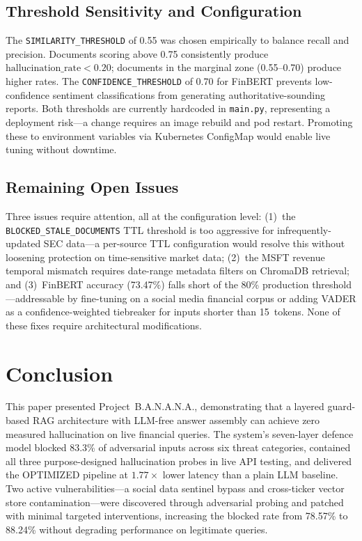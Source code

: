 \documentclass[10pt,twocolumn]{article}
\newcommand{\banana}{\mbox{B.A.N.A.N.A.}}
\begin{document}
\subsection{Threshold Sensitivity and Configuration}

The \texttt{SIMILARITY\_THRESHOLD} of 0.55 was chosen empirically to
balance recall and precision.
Documents scoring above 0.75 consistently produce
$\text{hallucination\_rate} < 0.20$; documents in the marginal zone
(0.55--0.70) produce higher rates.
The \texttt{CONFIDENCE\_THRESHOLD} of 0.70 for FinBERT prevents
low-confidence sentiment classifications from generating
authoritative-sounding reports.
Both thresholds are currently hardcoded in \texttt{main.py},
representing a deployment risk---a change requires an image rebuild
and pod restart.
Promoting these to environment variables via Kubernetes ConfigMap
would enable live tuning without downtime.

\subsection{Remaining Open Issues}

Three issues require attention, all at the configuration level:
(1)~the \texttt{BLOCKED\_STALE\_DOCUMENTS} TTL threshold is too
aggressive for infrequently-updated SEC data---a per-source TTL
configuration would resolve this without loosening protection on
time-sensitive market data;
(2)~the MSFT revenue temporal mismatch requires date-range metadata
filters on ChromaDB retrieval; and
(3)~FinBERT accuracy (73.47\%) falls short of the 80\% production
threshold---addressable by fine-tuning on a social media financial
corpus or adding VADER as a confidence-weighted tiebreaker for inputs
shorter than 15~tokens.
None of these fixes require architectural modifications.

\section{Conclusion}
\label{sec:conclusion}

This paper presented Project~\banana{}, demonstrating that a layered
guard-based RAG architecture with LLM-free answer assembly can achieve
zero measured hallucination on live financial queries.
The system's seven-layer defence model blocked 83.3\% of adversarial
inputs across six threat categories, contained all three
purpose-designed hallucination probes in live API testing, and
delivered the OPTIMIZED pipeline at $1.77\times$ lower latency than a
plain LLM baseline.
Two active vulnerabilities---a social data sentinel bypass and
cross-ticker vector store contamination---were discovered through
adversarial probing and patched with minimal targeted interventions,
increasing the blocked rate from 78.57\% to 88.24\% without degrading
performance on legitimate queries.
\end{document}
